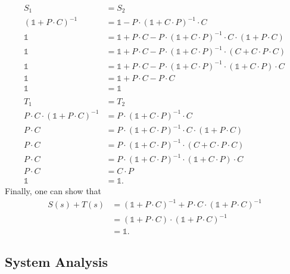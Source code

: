 \documentclass[a4paper,12 pt]{article}
\numberwithin{equation}{section}
\theoremstyle{definition}
\theoremstyle{remark}
\theoremstyle{definition}
\theoremstyle{definition}
\theoremstyle{definition}
\theoremstyle{remark}
\begin{document}
\begin{equation}
\begin{split}
S_1&=S_2\\
\left(\mathbb{1}+P\cdot C\right)^{-1}&=\mathbb{1}-P\cdot \left( \mathbb{1}+C\cdot P\right)^{-1}\cdot C\\
\mathbb{1}&=\mathbb{1}+P\cdot C-P\cdot \left( \mathbb{1}+C\cdot P\right)^{-1}\cdot C \cdot \left(\mathbb{1}+P\cdot C\right)\\
\mathbb{1}&=\mathbb{1}+P\cdot C -P\cdot \left( \mathbb{1}+C\cdot P\right)^{-1} \cdot \left(C+C\cdot P\cdot C\right)\\
\mathbb{1}&=\mathbb{1}+P\cdot C -P\cdot \left( \mathbb{1}+C\cdot P\right)^{-1} \cdot \left(\mathbb{1}+C\cdot P\right)\cdot C\\
\mathbb{1}&=\mathbb{1}+P\cdot C-P\cdot C\\
\mathbb{1}&=\mathbb{1}
\\
\\
T_1&=T_2\\
P\cdot C \cdot \left( \mathbb{1}+P\cdot C\right)^{-1}&=P\cdot \left( \mathbb{1}+C\cdot P\right)^{-1}\cdot C\\
P\cdot C &=P\cdot \left( \mathbb{1}+C\cdot P\right)^{-1}\cdot C\cdot \left( \mathbb{1}+P\cdot C\right)\\
P\cdot C &=P\cdot \left( \mathbb{1}+C\cdot P\right)^{-1}\cdot  \left( C+C\cdot P\cdot C\right)\\
P\cdot C &=P\cdot \left( \mathbb{1}+C\cdot P\right)^{-1}\cdot \left( \mathbb{1}+C\cdot P\right)\cdot C\\
P\cdot C&=C\cdot P\\
\mathbb{1}&=\mathbb{1}.
\end{split}
\end{equation}
Finally, one can show that 
\begin{equation}
\begin{split}
S(s)+T(s)&=\left(\mathbb{1}+P\cdot C\right)^{-1}+P\cdot C \cdot \left( \mathbb{1}+P\cdot C\right)^{-1}\\
&=\left(\mathbb{1}+P\cdot C\right)\cdot \left(\mathbb{1}+P\cdot C\right)^{-1}\\
&=\mathbb{1}.
\end{split}
\end{equation}
\subsection{System Analysis}
\end{document}
